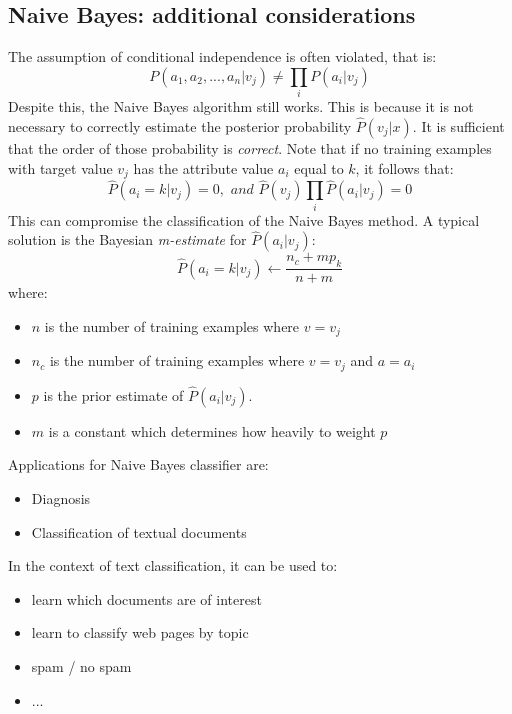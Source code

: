 \subsection{Naive Bayes: additional considerations}
The assumption of conditional independence is often violated, that is:
\[P(a_{1}, a_{2},...,a_{n}|v_{j}) \neq \prod_{i}P(a_{i}|v_{j})\]
Despite this, the Naive Bayes algorithm still works. This is because it is not necessary to correctly estimate the posterior probability $\hat{P}(v_{j}|x)$. It is sufficient that the order of those probability is \textit{correct}.\newline\newline
Note that if no training examples with target value $v_{j}$ has the attribute value $a_{i}$ equal to $k$, it follows that:
\[\hat{P}(a_{i} = k | v_{j}) = 0, \,\, and \,\, \hat{P}(v_{j})\prod_{i}\hat{P}(a_{i}|v_{j}) = 0\]
This can compromise the classification of the Naive Bayes method. A typical solution is the Bayesian \textit{m-estimate} for $\hat{P}(a_{i} | v_{j})$:
\[\hat{P}(a_{i} = k | v_{j}) \leftarrow \frac{n_{c} + mp_{k}}{n + m}\]
where:
\begin{itemize}
    \item $n$ is the number of training examples where $v = v_{j}$
    \item $n_{c}$ is the number of training examples where $v = v_{j}$ and $a = a_{i}$
    \item $p$ is the prior estimate of $\hat{P}(a_{i} | v_{j})$.
    \item $m$ is a constant which determines how heavily to weight $p$
\end{itemize}
Applications for Naive Bayes classifier are:
\begin{itemize}
    \item Diagnosis
    \item Classification of textual documents
\end{itemize}
In the context of text classification, it can be used to:
\begin{itemize}
    \item learn which documents are of interest
    \item learn to classify web pages by topic
    \item spam / no spam
    \item ...
\end{itemize}

